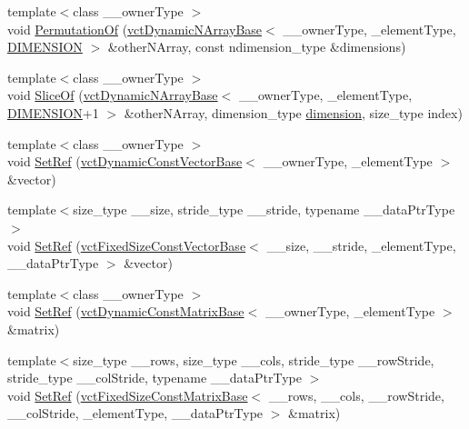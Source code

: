 \begin{DoxyCompactItemize}
{\footnotesize template$<$class \-\_\-\-\_\-owner\-Type $>$ }\\void \hyperlink{classvct_dynamic_n_array_ref_a45d4d5d388c223ee718751d8d539ec9f}{Permutation\-Of} (\hyperlink{classvct_dynamic_n_array_base}{vct\-Dynamic\-N\-Array\-Base}$<$ \-\_\-\-\_\-owner\-Type, \-\_\-element\-Type, \hyperlink{classvct_dynamic_n_array_ref_a92161a3e7a42576d3442eaf7bae097c1aa639cdab72a595c9cb324af98946bab5}{D\-I\-M\-E\-N\-S\-I\-O\-N} $>$ \&other\-N\-Array, const ndimension\-\_\-type \&dimensions)
\item 
{\footnotesize template$<$class \-\_\-\-\_\-owner\-Type $>$ }\\void \hyperlink{classvct_dynamic_n_array_ref_a85f74df442f837c625d2307878e193ef}{Slice\-Of} (\hyperlink{classvct_dynamic_n_array_base}{vct\-Dynamic\-N\-Array\-Base}$<$ \-\_\-\-\_\-owner\-Type, \-\_\-element\-Type, \hyperlink{classvct_dynamic_n_array_ref_a92161a3e7a42576d3442eaf7bae097c1aa639cdab72a595c9cb324af98946bab5}{D\-I\-M\-E\-N\-S\-I\-O\-N}+1 $>$ \&other\-N\-Array, dimension\-\_\-type \hyperlink{classvct_dynamic_const_n_array_base_aad976ad48dc9b1006d9e2729195f0b7c}{dimension}, size\-\_\-type index)
\item 
{\footnotesize template$<$class \-\_\-\-\_\-owner\-Type $>$ }\\void \hyperlink{classvct_dynamic_n_array_ref_ae0ece57aea479868bf10bc2eda6192fc}{Set\-Ref} (\hyperlink{classvct_dynamic_const_vector_base}{vct\-Dynamic\-Const\-Vector\-Base}$<$ \-\_\-\-\_\-owner\-Type, \-\_\-element\-Type $>$ \&vector)
\item 
{\footnotesize template$<$size\-\_\-type \-\_\-\-\_\-size, stride\-\_\-type \-\_\-\-\_\-stride, typename \-\_\-\-\_\-data\-Ptr\-Type $>$ }\\void \hyperlink{classvct_dynamic_n_array_ref_a4e0d19a8a0ffa5b6e70f862075b2a093}{Set\-Ref} (\hyperlink{classvct_fixed_size_const_vector_base}{vct\-Fixed\-Size\-Const\-Vector\-Base}$<$ \-\_\-\-\_\-size, \-\_\-\-\_\-stride, \-\_\-element\-Type, \-\_\-\-\_\-data\-Ptr\-Type $>$ \&vector)
\item 
{\footnotesize template$<$class \-\_\-\-\_\-owner\-Type $>$ }\\void \hyperlink{classvct_dynamic_n_array_ref_a39f95f35d4e4b341745e56037dc09db5}{Set\-Ref} (\hyperlink{classvct_dynamic_const_matrix_base}{vct\-Dynamic\-Const\-Matrix\-Base}$<$ \-\_\-\-\_\-owner\-Type, \-\_\-element\-Type $>$ \&matrix)
\item 
{\footnotesize template$<$size\-\_\-type \-\_\-\-\_\-rows, size\-\_\-type \-\_\-\-\_\-cols, stride\-\_\-type \-\_\-\-\_\-row\-Stride, stride\-\_\-type \-\_\-\-\_\-col\-Stride, typename \-\_\-\-\_\-data\-Ptr\-Type $>$ }\\void \hyperlink{classvct_dynamic_n_array_ref_a5e7f95e471582d00ed6a46221dc63d85}{Set\-Ref} (\hyperlink{classvct_fixed_size_const_matrix_base}{vct\-Fixed\-Size\-Const\-Matrix\-Base}$<$ \-\_\-\-\_\-rows, \-\_\-\-\_\-cols, \-\_\-\-\_\-row\-Stride, \-\_\-\-\_\-col\-Stride, \-\_\-element\-Type, \-\_\-\-\_\-data\-Ptr\-Type $>$ \&matrix)

\end{DoxyCompactItemize}
